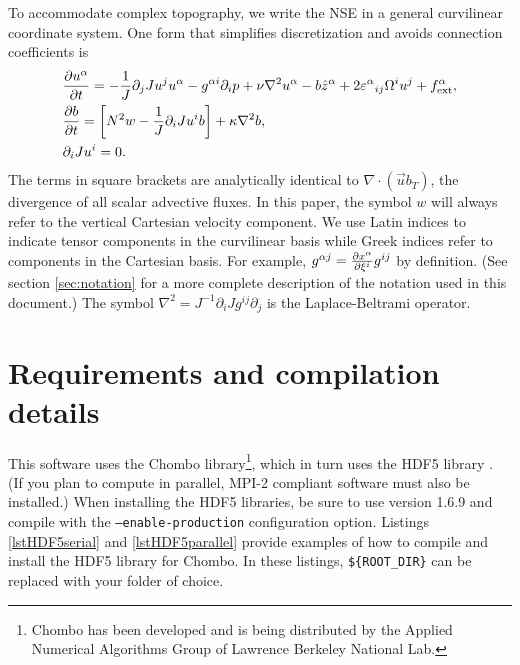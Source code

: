 \documentclass[12pt]{article}
\begin{document}
To accommodate complex topography, we write the NSE in a general curvilinear coordinate system. One form that simplifies
discretization and avoids connection coefficients is
\begin{subequations}\label{GCNSE}\begin{align}
  &\frac{\partial {u^\alpha}}{\partial t} = -\frac{1}{J}\partial_j Ju^j u^\alpha - g^{\alpha i}\partial_i p + \nu\nabla^2 u^\alpha - b\hat{z}^\alpha + 2{\varepsilon^{\alpha}}_{i j} \Omega^i u^j + f^\alpha_\text{ext}, \\
  &\frac{\partial {b}}{\partial t} = \left[ N^2 w - \frac{1}{J}\partial_i J u^i b \right] + \kappa\nabla^2 b,\\
  &\partial_i J u^i = 0.
\end{align}\end{subequations}
The terms in square brackets are analytically identical to
$\nabla \cdot (\vec{u} b_T)$, the divergence of all scalar advective fluxes. In this paper, the symbol $w$ will always refer to the vertical Cartesian
velocity component. We use Latin indices to indicate tensor components
in the curvilinear basis while Greek indices refer to components in the Cartesian basis. For
example, $g^{\alpha j} = \frac{\partial x^{\alpha}}{\partial \xi^{i}} g^{ij}$ by definition. (See section
\ref{sec:notation} for a more complete description of the notation used in
this document.) The symbol $\nabla^2=J^{-1}\partial_i J g^{ij}\partial_j$ is
the Laplace-Beltrami operator. 
\\


\section{Requirements and compilation details}
This software uses the Chombo library\footnote{Chombo has been developed and is being distributed by the Applied Numerical Algorithms Group of Lawrence Berkeley National Lab.}, which in turn uses the HDF5 library \cite{hdf5}. (If you plan to compute in parallel, MPI-2 compliant software must also be installed.) When installing the HDF5 libraries, be sure to use version 1.6.9 and compile with the \texttt{--enable-production} configuration option. Listings \ref{lstHDF5serial} and \ref{lstHDF5parallel} provide examples of how to compile and install the HDF5 library for Chombo. In these listings, \texttt{\$\{ROOT\_DIR\}} can be replaced with your folder of choice.
\end{document}
